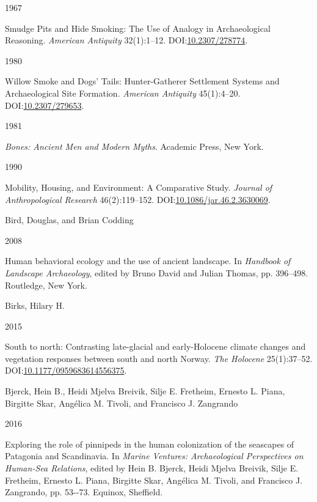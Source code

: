 \documentclass[
  12pt,
  a4paper,
  oneside]{book}
\newlength{\cslhangindent}
\newlength{\csllabelwidth}
\newlength{\cslentryspacingunit} %
\newenvironment{CSLReferences}[2] %
 {%
  \setlength{\parindent}{0pt}
  \ifodd #1
  \let\oldpar\par
  \def\par{\hangindent=\cslhangindent\oldpar}
  \fi
  \setlength{\parskip}{#2\cslentryspacingunit}
 }%
 {}
\newcommand{\CSLBlock}[1]{#1\hfill\break}
\newcommand{\CSLLeftMargin}[1]{\parbox[t]{\csllabelwidth}{#1}}
\newcommand{\CSLRightInline}[1]{\parbox[t]{\linewidth - \csllabelwidth}{#1}\break}
\begin{document}
\begin{CSLReferences}{0}{0}
\leavevmode{}%
\CSLLeftMargin{ 1967 }
\CSLRightInline{{Smudge Pits and Hide Smoking: The Use of Analogy in Archaeological Reasoning}. \emph{American Antiquity} 32(1):1--12. DOI:\href{https://doi.org/10.2307/278774}{10.2307/278774}.}

\leavevmode{}%
\CSLLeftMargin{ 1980 }
\CSLRightInline{{Willow Smoke and Dogs' Tails: Hunter-Gatherer Settlement Systems and Archaeological Site Formation}. \emph{American Antiquity} 45(1):4--20. DOI:\href{https://doi.org/10.2307/279653}{10.2307/279653}.}

\leavevmode{}%
\CSLLeftMargin{ 1981 }
\CSLRightInline{\emph{{Bones: Ancient Men and Modern Myths}}. Academic Press, New York.}

\leavevmode{}%
\CSLLeftMargin{ 1990 }
\CSLRightInline{Mobility, Housing, and Environment: A Comparative Study. \emph{Journal of Anthropological Research} 46(2):119--152. DOI:\href{https://doi.org/10.1086/jar.46.2.3630069}{10.1086/jar.46.2.3630069}.}

\leavevmode{}%
\CSLBlock{Bird, Douglas, and Brian Codding}
\CSLLeftMargin{ 2008}
\CSLRightInline{{Human behavioral ecology and the use of ancient landscape}. In \emph{{Handbook of Landscape Archaeology}}, edited by Bruno David and Julian Thomas, pp. 396--498. Routledge, New York.}

\leavevmode{}%
\CSLBlock{Birks, Hilary H.}
\CSLLeftMargin{ 2015}
\CSLRightInline{{South to north: Contrasting late-glacial and early-Holocene climate changes and vegetation responses between south and north Norway}. \emph{The Holocene} 25(1):37--52. DOI:\href{https://doi.org/10.1177/0959683614556375}{10.1177/0959683614556375}.}

\leavevmode{}%
\CSLBlock{Bjerck, Hein B., Heidi Mjelva Breivik, Silje E. Fretheim, Ernesto L. Piana, Birgitte Skar, Angélica M. Tivoli, and Francisco J. Zangrando}
\CSLLeftMargin{ 2016}
\CSLRightInline{{Exploring the role of pinnipeds in the human colonization of the seascapes of Patagonia and Scandinavia}. In \emph{{Marine Ventures: Archaeological Perspectives on Human-Sea Relations}}, edited by Hein B. Bjerck, Heidi Mjelva Breivik, Silje E. Fretheim, Ernesto L. Piana, Birgitte Skar, Angélica M. Tivoli, and Francisco J. Zangrando, pp. 53-\/-73. Equinox, Sheffield.}


\end{CSLReferences}
\end{document}
